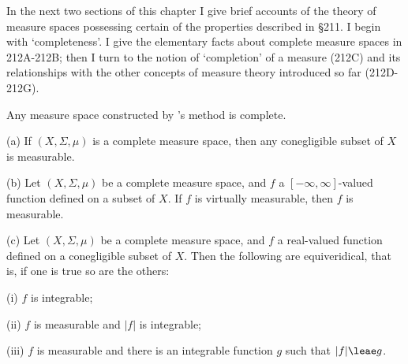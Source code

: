 
\def\chaptername{Taxonomy of measure spaces}
\def\sectionname{Complete spaces}


In the next two sections of this chapter I give brief accounts of the
theory of measure spaces possessing certain of the properties described
in \S211.   I begin with `completeness'.   I give the elementary
facts about complete measure spaces in 212A-212B;  then I turn to the notion of
`completion' of a measure (212C) and its relationships with the other
concepts of measure theory introduced so far (212D-212G).

 Any measure space constructed
by \Caratheodory's method is complete.


 (a) If $(X,\Sigma,\mu)$ is a complete measure
space, then any conegligible subset of $X$ is measurable.

(b) Let $(X,\Sigma,\mu)$ be a complete measure space, and $f$ a
$[-\infty,\infty]$-valued function defined on a subset of $X$.   If $f$ is
virtually measurable,
then $f$ is measurable.

(c) Let $(X,\Sigma,\mu)$ be a complete measure space, and $f$ a
real-valued function defined on a conegligible subset of $X$.   Then the
following are equiveridical, that is, if one is true so are the others:

\quad (i) $f$ is integrable;

\quad(ii) $f$ is measurable and $|f|$ is integrable;

\quad(iii) $f$ is measurable and there is an integrable function $g$
such that $|f|\leae g$.

